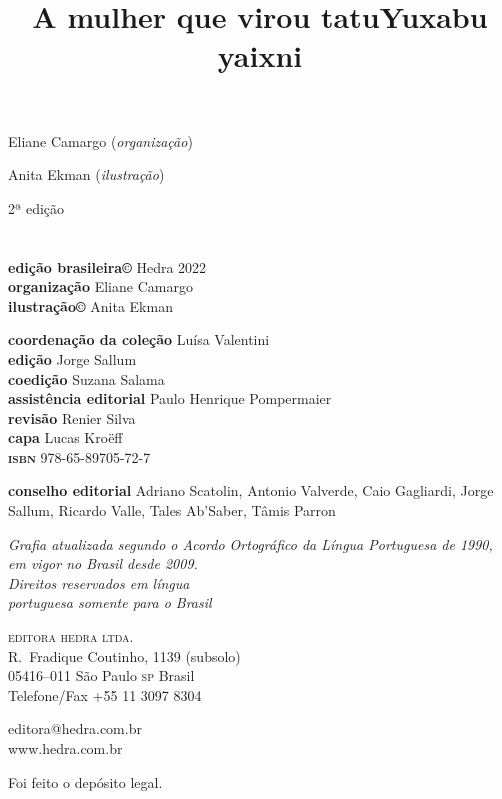 \title{A mulher que virou tatu}

\title{Yuxabu yaixni}


Eliane Camargo (\textit{organização})

Anita Ekman (\textit{ilustração})

2ª edição

\chapter{}

\textbf{edição brasileira©} Hedra 2022\\
\textbf{organização} Eliane Camargo\\
\textbf{ilustração©} Anita Ekman

\textbf{coordenação da coleção} Luísa Valentini\\
\textbf{edição} Jorge Sallum\\
\textbf{coedição} Suzana Salama\\
\textbf{assistência editorial} Paulo Henrique Pompermaier\\
\textbf{revisão} Renier Silva\\
\textbf{capa} Lucas Kroëff\\

\textbf{\textsc{isbn}} 978-65-89705-72-7

\textbf{conselho editorial} Adriano Scatolin, Antonio Valverde, Caio Gagliardi, Jorge Sallum, Ricardo Valle, Tales Ab'Saber, Tâmis Parron
 
\bigskip
\textit{Grafia atualizada segundo o Acordo Ortográfico da Língua
Portuguesa de 1990, em vigor no Brasil desde 2009.}\\

\vfill
\textit{Direitos reservados em língua\\ 
portuguesa somente para o Brasil}

\textsc{editora hedra ltda.}\\
R.~Fradique Coutinho, 1139 (subsolo)\\
05416--011 São Paulo \textsc{sp} Brasil\\
Telefone/Fax +55 11 3097 8304

editora@hedra.com.br\\
www.hedra.com.br

Foi feito o depósito legal.

\chapter{}


